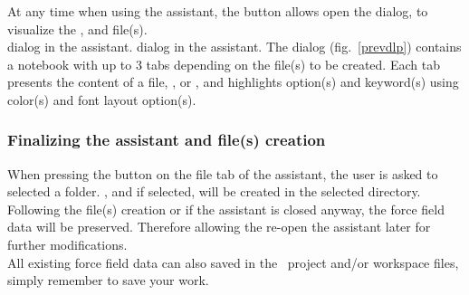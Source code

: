 \clearpage

\subsubsection*{}
\vspace{-0.125cm}

\clearpage

\subsubsection*{}
\vspace{-0.125cm}


\clearpage

\subsubsection{}

At any time when using the  assistant, the  button allows open the  dialog, to visualize the ,  and  file(s). \\
{ dialog in the  assistant.}{ dialog in the  assistant.}
\laf The  dialog (fig.~\ref{prevdlp}) contains a notebook with up to 3 tabs depending on the file(s) to be created. 
Each tab presents the content of a file, ,  or , and highlights option(s) and keyword(s) using color(s) and font layout option(s). 

\subsubsection{Finalizing the assistant and file(s) creation}

When pressing the  button on the file tab of the assistant, the user is asked to selected a folder. 
,  and  if selected, will be created in the selected directory. \\[0.25cm]
Following the file(s) creation or if the assistant is closed anyway, the  force field data will be 
preserved. 
Therefore allowing the re-open the assistant later for further modifications. \\[0.25cm]
All existing force field data can also saved in the \atomes\ project and/or workspace files, simply remember to save your work. 


